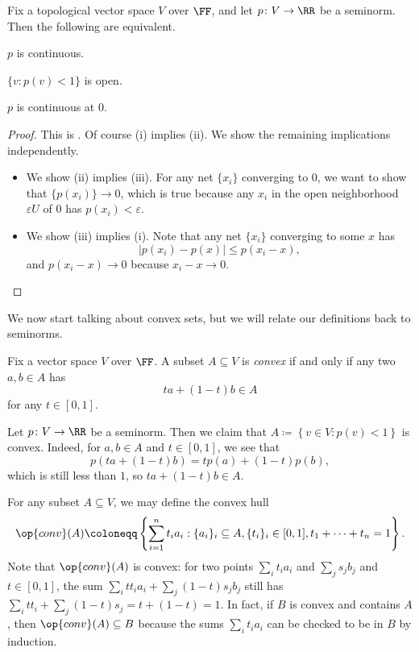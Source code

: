 \documentclass[notes.tex]{subfiles}
\begin{document}
\begin{lemma} \label{lem:seminorm-continuity-grab-bag}
	Fix a topological vector space $V$ over $\FF$, and let $p\colon V\to\RR$ be a seminorm. Then the following are equivalent.
	\begin{listroman}
		\item $p$ is continuous.
		\item $\{v:p(v)<1\}$ is open.
		\item $p$ is continuous at $0$.
	\end{listroman}
\end{lemma}
\begin{proof}
	This is \cite[Proposition~1.3]{conway-functional}. Of course (i) implies (ii). We show the remaining implications independently.
	\begin{itemize}
		\item We show (ii) implies (iii). For any net $\{x_i\}$ converging to $0$, we want to show that $\{p(x_i)\}\to0$, which is true because any $x_i$ in the open neighborhood $\varepsilon U$ of $0$ has $p(x_i)<\varepsilon$.
		\item We show (iii) implies (i). Note that any net $\{x_i\}$ converging to some $x$ has
		\[\left|p(x_i)-p(x)\right|\le p(x_i-x),\]
		and $p(x_i-x)\to0$ because $x_i-x\to0$.
		\qedhere
	\end{itemize}
\end{proof}
We now start talking about convex sets, but we will relate our definitions back to seminorms.
\begin{definition}[convex]
	Fix a vector space $V$ over $\FF$. A subset $A\subseteq V$ is \textit{convex} if and only if any two $a,b\in A$ has
	\[ta+(1-t)b\in A\]
	for any $t\in[0,1]$.
\end{definition}
\begin{example} \label{ex:seminorm-to-convex}
	Let $p\colon V\to\RR$ be a seminorm. Then we claim that $A\coloneqq\left\{v\in V:p(v)<1\right\}$ is convex. Indeed, for $a,b\in A$ and $t\in[0,1]$, we see that
	\[p(ta+(1-t)b)=tp(a)+(1-t)p(b),\]
	which is still less than $1$, so $ta+(1-t)b\in A$.
\end{example}
\begin{example} \label{ex:convex-hull}
	For any subset $A\subseteq V$, we may define the convex hull
	\[\op{conv}(A)\coloneqq\left\{\sum_{i=1}^nt_ia_i:\{a_i\}_i\subseteq A,\{t_i\}_i\in[0,1],t_1+\cdots+t_n=1\right\}.\]
	Note that $\op{conv}(A)$ is convex: for two points $\sum_it_ia_i$ and $\sum_js_jb_j$ and $t\in[0,1]$, the sum $\sum_itt_ia_i+\sum_j(1-t)s_jb_j$ still has $\sum_itt_i+\sum_j(1-t)s_j=t+(1-t)=1$. In fact, if $B$ is convex and contains $A$, then $\op{conv}(A)\subseteq B$ because the sums $\sum_it_ia_i$ can be checked to be in $B$ by induction.
\end{example}
\end{document}
